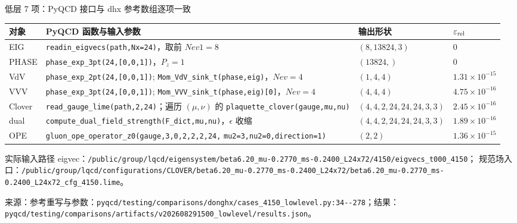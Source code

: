 \documentclass[UTF8,aspectratio=169,11pt]{ctexbeamer}
\newcommand{\source}[1]{\vspace{0.05em}\par{\raggedright\scriptsize\color{muted}来源：#1\par}}
\newcommand{\codepath}[1]{\nolinkurl{#1}}
\begin{document}
\begin{frame}[t]{低层 7 项：PyQCD 接口与 dhx 参考数组逐项一致}
  \scriptsize
  \setlength{\tabcolsep}{3pt}
  \renewcommand{\arraystretch}{1.05}
  \begin{tabularx}{0.96\textwidth}{@{}l Y l l@{}}
    \toprule
    对象 & PyQCD 函数与输入参数 & 输出形状 & $\varepsilon_{\rm rel}$ \\
    \midrule
    EIG & \codepath{readin_eigvecs(path,Nx=24)}，取前 $Nev1=8$ & $(8,13824,3)$ & $0$ \\
    PHASE & \codepath{phase_exp_3pt(24,[0,0,1])}，$P_z=1$ & $(13824,)$ & $0$ \\
    VdV & \codepath{phase_exp_2pt(24,[0,0,1])};\newline
      \codepath{Mom_VdV_sink_t(phase,eig)}，$Nev=4$ & $(1,4,4)$ & $1.31\times10^{-15}$ \\
    VVV & \codepath{phase_exp_3pt(24,[0,0,1])};\newline
      \codepath{Mom_VVV_sink_t(phase,eig)[0]}，$Nev=4$ & $(4,4,4)$ & $4.75\times10^{-16}$ \\
    Clover & \codepath{read_gauge_lime(path,2,24)}；遍历 $(\mu,\nu)$ 的\newline
      \codepath{plaquette_clover(gauge,mu,nu)} & $(4,4,2,24,24,24,3,3)$ & $2.45\times10^{-16}$ \\
    dual & \codepath{compute_dual_field_strength(F_dict,mu,nu)}，$\epsilon$ 收缩 & $(4,4,2,24,24,24,3,3)$ & $1.89\times10^{-16}$ \\
    OPE & \codepath{gluon_ope_operator_z0(gauge,3,0,2,2,2,24,}\newline
      \codepath{mu2=3,nu2=0,direction=1)} & $(2,2)$ & $1.36\times10^{-15}$ \\
    \bottomrule
  \end{tabularx}
  \vspace{0.12em}
  \begin{block}{实际输入路径}
    eigvec：\codepath{/public/group/lqcd/eigensystem/beta6.20_mu-0.2770_ms-0.2400_L24x72/4150/eigvecs_t000_4150}；\newline
    规范场入口：\codepath{/public/group/lqcd/configurations/CLOVER/beta6.20_mu-0.2770_ms-0.2400_L24x72/beta6.20_mu-0.2770_ms-0.2400_L24x72_cfg_4150.lime}。
  \end{block}
  \source{参考重写与参数：\codepath{pyqcd/testing/comparisons/donghx/cases_4150_lowlevel.py:34--278}；结果：\codepath{pyqcd/testing/comparisons/artifacts/v202608291500_lowlevel/results.json}。}
\end{frame}
\end{document}
